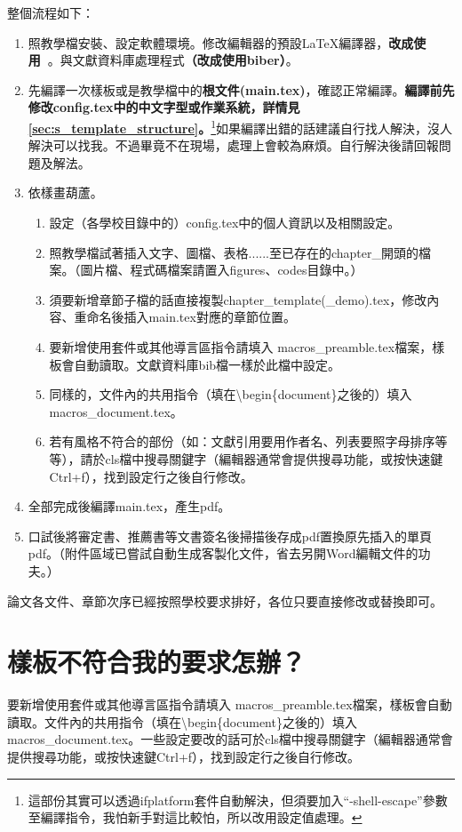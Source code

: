 \documentclass[class=NCU_thesis, crop=false, float=true]{standalone}
\begin{document}
整個流程如下：
\begin{enumerate}
    \item 照教學檔安裝、設定軟體環境。修改編輯器的預設LaTeX編譯器，\textbf{改成使用\XeLaTeX\ }。與文獻資料庫處理程式\textbf{（改成使用biber）}。
    \item 先編譯一次樣板或是教學檔中的\textbf{根文件(main.tex)}，確認正常編譯。\textbf{編譯前先修改config.tex中的中文字型或作業系統，詳情見\cref{sec:s_template_structure}。}\footnote{這部份其實可以透過ifplatform套件自動解決，但須要加入``-shell-escape''參數至編譯指令，我怕新手對這比較怕，所以改用設定值處理。}如果編譯出錯的話建議自行找人解決，沒人解決可以找我。不過畢竟不在現場，處理上會較為麻煩。自行解決後請回報問題及解法。
    \item 依樣畫葫蘆。
    \begin{enumerate}
        \item 設定（各學校目錄中的）config.tex中的個人資訊以及相關設定。
        \item 照教學檔試著插入文字、圖檔、表格......至已存在的chapter\_開頭的檔案。（圖片檔、程式碼檔案請置入figures、codes目錄中。）
        \item 須要新增章節子檔的話直接複製chapter\_template(\_demo).tex，修改內容、重命名後插入main.tex對應的章節位置。
        \item 要新增使用套件或其他導言區指令請填入 macros\_preamble.tex檔案，樣板會自動讀取。文獻資料庫bib檔一樣於此檔中設定。
        \item 同樣的，文件內的共用指令（填在\textbackslash{}begin\{document\}之後的）填入macros\_document.tex。
        \item 若有風格不符合的部份（如：文獻引用要用作者名、列表要照字母排序等等），請於cls檔中搜尋關鍵字（編輯器通常會提供搜尋功能，或按快速鍵Ctrl+f），找到設定行之後自行修改。
    \end{enumerate}
    \item 全部完成後編譯main.tex，產生pdf。
    \item 口試後將審定書、推薦書等文書簽名後掃描後存成pdf置換原先插入的單頁pdf。（附件區域已嘗試自動生成客製化文件，省去另開Word編輯文件的功夫。）
\end{enumerate}
論文各文件、章節次序已經按照學校要求排好，各位只要直接修改或替換即可。

\section{樣板不符合我的要求怎辦？}
要新增使用套件或其他導言區指令請填入 macros\_preamble.tex檔案，樣板會自動讀取。文件內的共用指令（填在\textbackslash{}begin\{document\}之後的）填入macros\_document.tex。一些設定要改的話可於cls檔中搜尋關鍵字（編輯器通常會提供搜尋功能，或按快速鍵Ctrl+f），找到設定行之後自行修改。
\end{document}
